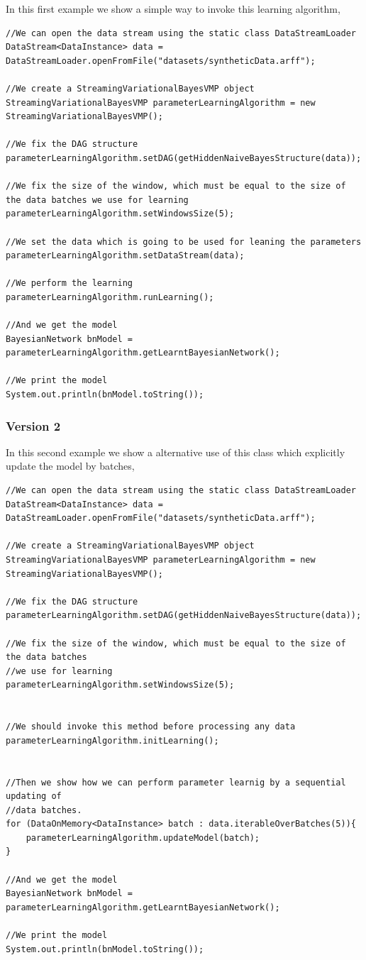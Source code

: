 In this first example we show a simple way to invoke this learning algorithm,


\begin{lstlisting}
//We can open the data stream using the static class DataStreamLoader
DataStream<DataInstance> data = DataStreamLoader.openFromFile("datasets/syntheticData.arff");

//We create a StreamingVariationalBayesVMP object
StreamingVariationalBayesVMP parameterLearningAlgorithm = new StreamingVariationalBayesVMP();

//We fix the DAG structure
parameterLearningAlgorithm.setDAG(getHiddenNaiveBayesStructure(data));

//We fix the size of the window, which must be equal to the size of the data batches we use for learning
parameterLearningAlgorithm.setWindowsSize(5);

//We set the data which is going to be used for leaning the parameters
parameterLearningAlgorithm.setDataStream(data);

//We perform the learning
parameterLearningAlgorithm.runLearning();

//And we get the model
BayesianNetwork bnModel = parameterLearningAlgorithm.getLearntBayesianNetwork();

//We print the model
System.out.println(bnModel.toString());
\end{lstlisting}


\subsubsection*{Version 2}

In this second example we show a alternative use of this class which explicitly update the model by batches, 


\begin{lstlisting}
//We can open the data stream using the static class DataStreamLoader
DataStream<DataInstance> data = DataStreamLoader.openFromFile("datasets/syntheticData.arff");

//We create a StreamingVariationalBayesVMP object
StreamingVariationalBayesVMP parameterLearningAlgorithm = new StreamingVariationalBayesVMP();

//We fix the DAG structure
parameterLearningAlgorithm.setDAG(getHiddenNaiveBayesStructure(data));

//We fix the size of the window, which must be equal to the size of the data batches 
//we use for learning
parameterLearningAlgorithm.setWindowsSize(5);


//We should invoke this method before processing any data
parameterLearningAlgorithm.initLearning();


//Then we show how we can perform parameter learnig by a sequential updating of 
//data batches.
for (DataOnMemory<DataInstance> batch : data.iterableOverBatches(5)){
    parameterLearningAlgorithm.updateModel(batch);
}

//And we get the model
BayesianNetwork bnModel = parameterLearningAlgorithm.getLearntBayesianNetwork();

//We print the model
System.out.println(bnModel.toString());
\end{lstlisting}


